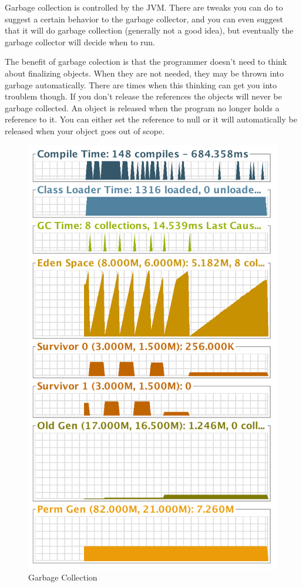 \documentclass[fleqn,10pt]{SelfArx} %
\begin{document}
Garbage collection is controlled by the JVM. There are tweaks you can do to suggest a certain behavior to the garbage collector, and you can even suggest that it will do garbage collection (generally not a good idea), but eventually the garbage collector will decide when to run.

The benefit of garbage colection is that the programmer doesn't need to think about finalizing objects. When they are not needed, they may be thrown into garbage automatically. There are times when this thinking can get you into troublem though. If you don't release the references the objects will never be garbage collected. An object is released when the program no longer holds a reference to it. You can either set the reference to null or it will automatically be released when your object goes out of scope.
\begin{figure}[H]\centering %
\includegraphics[width=\linewidth]{garbage-collection}
\caption{Garbage Collection}
\label{fig:garbage-collection}
\end{figure}
\end{document}
